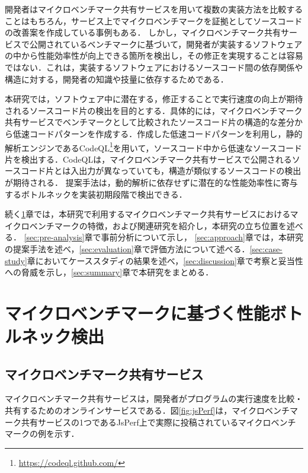 \documentclass[submit,techrep,noauthor]{ipsj}
\begin{document}
開発者はマイクロベンチマーク共有サービスを用いて複数の実装方法を比較することはもちろん，サービス上でマイクロベンチマークを証拠としてソースコードの改善案を作成している事例もある\cite{saiki}．
しかし，マイクロベンチマーク共有サービスで公開されているベンチマークに基づいて，開発者が実装するソフトウェアの中から性能効率性が向上できる箇所を検出し，その修正を実現することは容易ではない．これは，実装するソフトウェアにおけるソースコード間の依存関係や構造に対する，開発者の知識や技量に依存するためである．

本研究では，ソフトウェア中に潜在する，修正することで実行速度の向上が期待されるソースコード片の検出を目的とする．具体的には，マイクロベンチマーク共有サービスでベンチマークとして比較されたソースコード片の構造的な差分から低速コードパターンを作成する．作成した低速コードパターンを利用し，静的解析エンジンであるCodeQL\footnote{\url{https://codeql.github.com/}}\cite{ql}を用いて，ソースコード中から低速なソースコード片を検出する．CodeQLは，マイクロベンチマーク共有サービスで公開されるソースコード片とは入出力が異なっていても，構造が類似するソースコードの検出が期待される．
提案手法は，動的解析に依存せずに潜在的な性能効率性に寄与するボトルネックを実装初期段階で検出できる．

続く\ref{sec:background}章では，本研究で利用するマイクロベンチマーク共有サービスにおけるマイクロベンチマークの特徴，および関連研究を紹介し，本研究の立ち位置を述べる． \ref{sec:pre-analysis}章で事前分析について示し， \ref{sec:approach}章では，本研究の提案手法を述べ，\ref{sec:evaluation}章で評価方法について述べる．\ref{sec:case-study}章においてケーススタディの結果を述べ，\ref{sec:discussion}章で考察と妥当性への脅威を示し，\ref{sec:summary}章で本研究をまとめる． 


\section{マイクロベンチマークに基づく性能ボトルネック検出}
\label{sec:background}

\subsection{マイクロベンチマーク共有サービス}


マイクロベンチマーク共有サービスは，開発者がプログラムの実行速度を比較・共有するためのオンラインサービスである．図\ref{fig:jsPerf}は，マイクロベンチマーク共有サービスの1つであるJsPerf上で実際に投稿されているマイクロベンチマークの例を示す．
\end{document}
